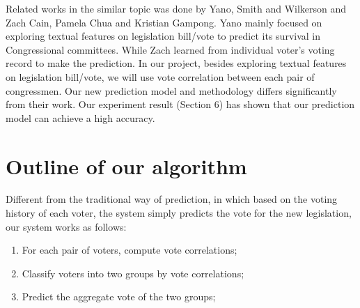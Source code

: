 \documentclass{article} %
\begin{document}
Related works in the similar topic was done by Yano, Smith and Wilkerson\cite{textual} and Zach Cain, Pamela Chua and Kristian Gampong\cite{stanford}. Yano\cite{textual} mainly focused on exploring textual features on legislation bill/vote to predict its survival in Congressional committees. While Zach\cite{stanford} learned from individual voter's voting record to make the prediction. In our project, besides exploring textual features on legislation bill/vote, we will use vote correlation between each pair of congressmen. Our new prediction model and methodology differs significantly from their work. Our experiment result (Section 6) has shown that our prediction model can achieve a high accuracy.

\section{Outline of our algorithm}
Different from the traditional way of prediction, in which based on the voting history of each voter, the system simply predicts the vote for the new legislation, our system works as follows:     
    \begin{enumerate}         
        \item For each pair of voters, compute vote correlations;
        \item Classify voters into two groups by vote correlations;
        \item Predict the aggregate vote of the two groups;
    \end{enumerate}
\end{document}
